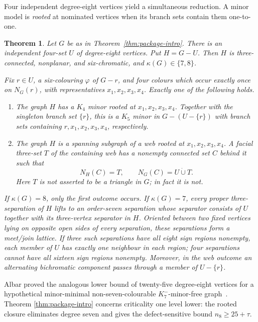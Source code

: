 \documentclass[11pt]{amsart}
\newtheorem{theorem}{Theorem}[section]
\begin{document}
Four independent degree-eight vertices yield a simultaneous reduction.  A
minor model is \emph{rooted} at nominated vertices when its
branch sets contain them one-to-one.

\begin{theorem}\label{thm:four-centre-intro}
Let $G$ be as in Theorem~\ref{thm:package-intro}.  There is an independent
four-set $U$ of degree-eight vertices.  Put $H=G-U$.  Then $H$ is
three-connected, nonplanar, and six-chromatic, and
$\kappa(G)\in\{7,8\}$.

Fix $r\in U$, a six-colouring $\varphi$ of $G-r$, and four colours which
occur exactly once on $N_G(r)$, with representatives
$x_1,x_2,x_3,x_4$.  Exactly one of the following holds.

\begin{enumerate}
\item The graph $H$ has a $K_4$ minor rooted at
      $x_1,x_2,x_3,x_4$.  Together with the singleton branch set $\{r\}$,
      this is a $K_5$ minor in $G-(U-\{r\})$ with branch sets containing
      $r,x_1,x_2,x_3,x_4$, respectively.
\item The graph $H$ is a spanning subgraph of a web rooted at
      $x_1,x_2,x_3,x_4$.  A facial three-set $T$ of the containing web has
      a nonempty connected set $C$ behind it such that
      \[
             N_H(C)=T,\qquad
             N_G(C)=U\mathbin{\dot\cup}T.              \tag{1.1}
      \]
      Here $T$ is not asserted to be a triangle in $G$; in fact it is not.
\end{enumerate}

If $\kappa(G)=8$, only the first outcome occurs.  If $\kappa(G)=7$, every
proper three-separation of $H$ lifts to an order-seven separation whose
separator consists of $U$ together with its three-vertex separator in $H$.
Oriented between
two fixed vertices lying on opposite open sides of every separation, these
separations form a meet/join lattice.  If three such separations have all eight
sign regions nonempty, each member of $U$ has exactly one neighbour in each
region; four separations cannot have all sixteen sign regions nonempty.  Moreover,
in the web outcome an alternating bichromatic component passes through a
member of $U-\{r\}$.
\end{theorem}

Albar proved the analogous lower bound of twenty-five degree-eight
vertices for a hypothetical minor-minimal non-seven-colourable
$K_7^{-}$-minor-free graph~\cite[Lemma~6]{Albar2014}.  Theorem
\ref{thm:package-intro} concerns criticality one level lower: the rooted
closure eliminates degree seven and gives the defect-sensitive bound
$n_8\geq25+\tau$.
\end{document}
